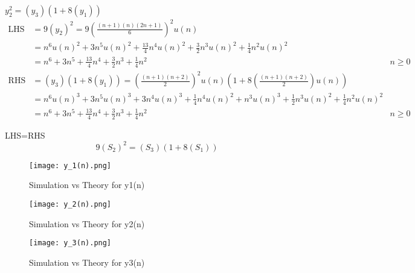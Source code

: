 \documentclass[journal,12pt,onecolumn]{IEEEtran}
\theoremstyle{remark}
\begin{document}
$y_2^2 = (y_3)(1 + 8(y_1))$ 
\begin{align}
\text{LHS} &= 9(y_2)^2 = 9\left(\frac{(n+1)(n)(2n+1)}{6}\right)^2u(n)\\
&=n^6 u(n)^2 + 3n^5 u(n)^2 + \frac{13}{4}n^4 u(n)^2 + \frac{3}{2}n^3 u(n)^2 + \frac{1}{4}n^2 u(n)^2\\
&= n^6 + 3n^5 + \frac{13}{4}n^4 + \frac{3}{2}n^3 + \frac{1}{4}n^2 &n\geq0\\
\text{RHS} &= (y_3)(1 + 8(y_1)) = \left(\frac{(n+1)(n+2)}{2}\right)^2u(n)(1+8\left(\frac{(n+1)(n+2)}{2}\right)u(n)) \\
&=n^6 u(n)^3 + 3n^5 u(n)^3 + 3n^4 u(n)^3 + \frac{1}{4}n^4 u(n)^2 + n^3 u(n)^3 + \frac{1}{2}n^3 u(n)^2 + \frac{1}{4}n^2 u(n)^2\\
&= n^6 + 3n^5 + \frac{13}{4}n^4 + \frac{3}{2}n^3 + \frac{1}{4}n^2 &n\geq0
\end{align}

LHS=RHS
\[ 9(S_2)^2 = (S_3)(1 + 8(S_1)) \]
\begin{figure}[htbp]
    \centering
    \texttt{[image: y\_1(n).png]}
    \caption{Simulation vs Theory for y1(n)}
    \label{fig:figure1}
\end{figure}  

\begin{figure}[htbp]
    \centering
    \texttt{[image: y\_2(n).png]}
    \caption{Simulation vs Theory for y2(n)}
    \label{fig:figure2}
\end{figure}   

\begin{figure}[htbp]
    \centering
    \texttt{[image: y\_3(n).png]}
    \caption{Simulation vs Theory for y3(n) }
    \label{fig:figure3}
\end{figure} 
\end{document}
